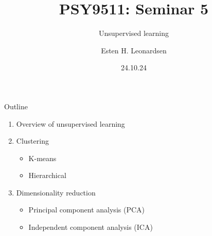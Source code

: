 \documentclass[10pt]{beamer}
\title{PSY9511: Seminar 5}
\subtitle{Unsupervised learning}
\author{Esten H. Leonardsen}
\date{24.10.24}
\begin{document}
	\begin{frame}
	 	\maketitle
	\end{frame}

    \begin{frame}{Outline}
        \begin{enumerate}
            \item Overview of unsupervised learning
            \item Clustering
            \begin{itemize}
                \item K-means
                \item Hierarchical
            \end{itemize}
            \item Dimensionality reduction
            \begin{itemize}
                \item Principal component analysis (PCA)
                \item Independent component analysis (ICA)
            \end{itemize}
        \end{enumerate}
    \end{frame}

    
    
\end{document}
